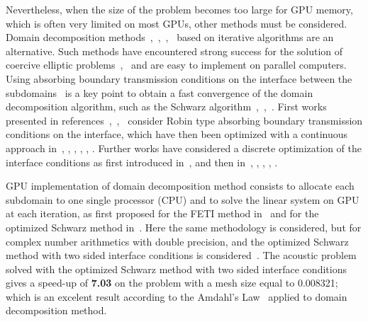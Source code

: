 \documentclass[10pt]{article}
\theoremstyle{plain}
\theoremstyle{definition}
\theoremstyle{remark}
\begin{document}
Nevertheless, when the size of the problem becomes too large for GPU memory, which is often very limited on most GPUs, other methods must be considered.
Domain decomposition methods~\cite{Smith:1996:DPM},~\cite{quarteroni_domain_1999},~\cite{toselli_domain_2004},~\cite{magoules:journal-auth:21} based on iterative algorithms are an alternative. 
Such methods have encountered strong success for the solution of coercive elliptic problems~\cite{NME:NME1620320604},~\cite{cai_overlapping_1998} and are easy to implement on parallel computers.  
Using absorbing boundary transmission conditions on the interface between the subdomains~\cite{magoules:journal-auth:16} is a key point to obtain a fast convergence of the  domain decomposition algorithm, such as the Schwarz algorithm~\cite{magoulesf_contrib_3:Lions:1988:SAM},~\cite{magoulesf_contrib_3:Lions:1989:SAM},~\cite{magoulesf_contrib_3:Lions:1990:SAM}.
First works presented in references~\cite{Despres:1993:DDM},~\cite{magoulesf_contrib_3:Despres:1992:DHM},~\cite{Benamou:1997:DDM} consider Robin type absorbing boundary transmission conditions on the interface, which have then been optimized with a continuous approach in~\cite{magoulesf_contrib_3:Chevalier:1998:SMO}, \cite{magoulesf_contrib_3:Gander:2000:OSM}, \cite{magoules:journal-auth:24}, \cite{magoules:journal-auth:23}, \cite{magoules:journal-auth:18}, \cite{magoules:journal-auth:14}.
Further works have considered a discrete optimization of the interface conditions as first introduced in~\cite{magoules:proceedings-auth:6}, and then in~\cite{magoules:journal-auth:29}, \cite{magoules:journal-auth:20}, \cite{magoules:journal-auth:17}, \cite{magoules:journal-auth:12}, \cite{magoules:journal-auth:30}.

GPU implementation of domain decomposition method consists to allocate each subdomain to one single processor (CPU) and to solve the linear system on GPU at each iteration, as first proposed for the FETI method in~\cite{Papadrakakis:2011} and for the optimized Schwarz method in~\cite{magoules:proceedings-auth:50}.
Here the same methodology is considered, but for complex number arithmetics with double precision, and the optimized Schwarz method with two sided interface conditions is considered~\cite{magoules:journal-auth:28}.
The acoustic problem solved with the optimized Schwarz method with two sided interface conditions gives a speed-up of {\bf 7.03} on the problem with a mesh size equal to 0.008321; which is an excelent result according to the Amdahl's Law~\cite{amdahl} applied to domain decomposition method.
\end{document}
